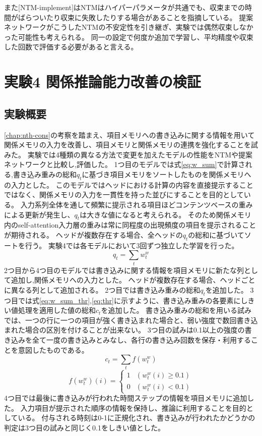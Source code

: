 また[NTM-implement]はNTMはハイパーパラメータが共通でも、収束までの時間がばらついたり収束に失敗したりする場合があることを指摘している。
提案ネットワークがこうしたNTMの不安定性を引き継ぎ、実験では偶然収束しなかった可能性も考えられる。
同一の設定で何度か追加で学習し、平均精度や収束した回数で評価する必要があると言える。

\section{実験4 関係推論能力改善の検証}
\subsection{実験概要}
\ref{chap:nth-cons}の考察を踏まえ、項目メモリへの書き込みに関する情報を用いて関係メモリの入力を改善し、項目メモリと関係メモリの連携を強化することを試みた。
実験では4種類の異なる方法で変更を加えたモデルの性能をNTMや提案ネットワークと比較し,評価した。
1つ目のモデルでは式\ref{eq:w_sum}で計算される,書き込み重みの総和$q_t$に基づき項目メモリをソートしたものを関係メモリへの入力とした。
このモデルではヘッドにおける計算の内容を直接提示することではなく、関係メモリの入力を一貫性を持った並びにすることを目的としている。
入力系列全体を通して頻繁に提示される項目ほどコンテンツベースの重みによる更新が発生し、$q_t$は大きな値になると考えられる。
そのため関係メモリ内のself-attention入力層の重みは常に同程度の出現頻度の項目を提示されることが期待される。
ヘッドが複数存在する場合、全ヘッドの$q_t$の総和に基づいてソートを行う。
実験4では各モデルにおいて3回ずつ独立した学習を行った。
\begin{equation}\label{eq:w_sum}
	q_t=\sum_t{w^w_t}
\end{equation}
2つ目から4つ目のモデルでは書き込みに関する情報を項目メモリに新たな列として追加し,関係メモリへの入力とした。
ヘッドが複数存在する場合、ヘッドごとに異なる列として追加される。
2つ目では書き込み重みの総和$q_t$を追加した。
3つ目では式\ref{eq:w_sum_thr},\ref{eq:thr}に示すように、書き込み重みの各要素にしきい値処理を適用した値の総和$c_t$を追加した。
書き込み重みの総和を用いる試みでは、一つの行に一つの項目が強く書き込まれた場合と、弱い強度で数回書き込まれた場合の区別を付けることが出来ない。
3つ目の試みは0.1以上の強度の書き込みを全て一度の書き込みとみなし、各行の書き込み回数を保存・利用することを意図したものである。
\begin{equation}\label{eq:w_sum_thr}
	c_t=\sum_tf(w^w_t)
\end{equation}
\begin{equation}\label{eq:thr}
	f(w^w_t)(i)=
	\begin{cases}
	1 & (w^w_t(i) \geq 0.1)\\
	0 & (w^w_t(i) < 0.1)
	\end{cases}
\end{equation}
4つ目では最後に書き込みが行われた時間ステップの情報を項目メモリに追加した。
入力項目が提示された順序の情報を保持し、推論に利用することを目的としている。
付与される時刻は0-1に正規化され、書き込みが行われたかどうかの判定は3つ目の試みと同じく0.1をしきい値とした。

